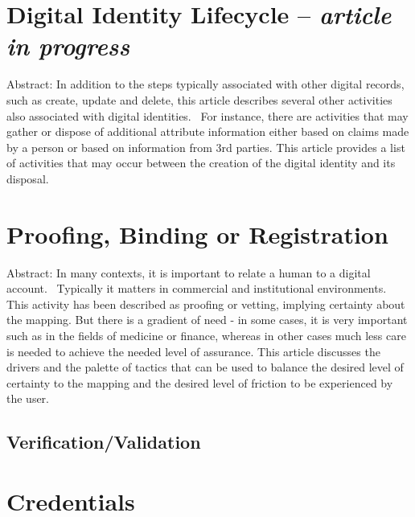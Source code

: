 \hypertarget{digital-identity-lifecycle-article-in-progress}{%
\section{\texorpdfstring{Digital Identity Lifecycle -- \emph{article
in
progress}}{Digital Identity Lifecycle -- article in progress}}\label{digital-identity-lifecycle-article-in-progress}}

Abstract: In addition to the steps typically associated with other
digital records, such as create, update and delete, this article
describes several other activities also associated with digital
identities.~ For instance, there are activities that may gather or
dispose of additional attribute information either based on claims made
by a person or based on information from 3rd parties. This article
provides a list of activities that may occur between the creation of the
digital identity and its disposal.

\hypertarget{proofing-binding-or-registration}{%
\section{\texorpdfstring{Proofing, Binding or Registration
}{Proofing, Binding or Registration }}\label{proofing-binding-or-registration}}

Abstract: In many contexts, it is important to relate a human to a
digital account.~ Typically it matters in commercial and institutional
environments. This activity has been described as proofing or vetting,
implying certainty about the mapping. But there is a gradient of need -
in some cases, it is very important such as in the fields of medicine or
finance, whereas in other cases much less care is needed to achieve the
needed level of assurance. This article discusses the drivers and the
palette of tactics that can be used to balance the desired level of
certainty to the mapping and the desired level of friction to be
experienced by the user.

\hypertarget{verificationvalidation}{%
\subsection{Verification/Validation}\label{verificationvalidation}}

\hypertarget{credentials}{%
\section{Credentials}\label{credentials}}


